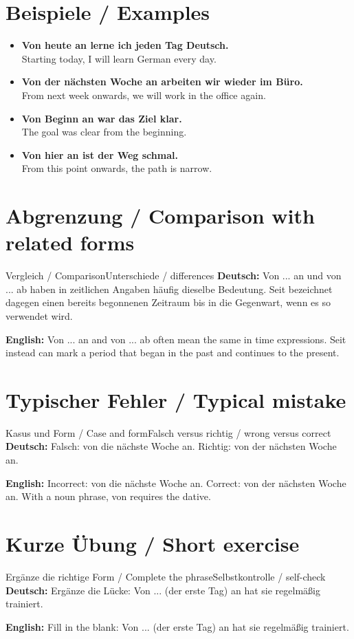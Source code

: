 \documentclass[a4paper,11pt]{article}
\newcommand{\GermanText}[1]{\textbf{Deutsch: }#1\par}
\newcommand{\EnglishText}[1]{{\small\color{SoftGray}\textbf{English: }#1\par}}
\newcommand{\ExampleItem}[2]{\item \textbf{#1}\\{\small\color{SoftGray}#2}}
\begin{document}
\section{Beispiele / Examples}
\begin{exbox}
\begin{itemize}
\ExampleItem{Von heute an lerne ich jeden Tag Deutsch.}{Starting today, I will learn German every day.}
\ExampleItem{Von der nächsten Woche an arbeiten wir wieder im Büro.}{From next week onwards, we will work in the office again.}
\ExampleItem{Von Beginn an war das Ziel klar.}{The goal was clear from the beginning.}
\ExampleItem{Von hier an ist der Weg schmal.}{From this point onwards, the path is narrow.}
\end{itemize}
\end{exbox}
\section{Abgrenzung / Comparison with related forms}
\begin{grammarentry}{Vergleich / Comparison}{Unterschiede / differences}
\GermanText{Von ... an und von ... ab haben in zeitlichen Angaben häufig dieselbe Bedeutung. Seit bezeichnet dagegen einen bereits begonnenen Zeitraum bis in die Gegenwart, wenn es so verwendet wird.}
\EnglishText{Von ... an and von ... ab often mean the same in time expressions. Seit instead can mark a period that began in the past and continues to the present.}
\end{grammarentry}
\section{Typischer Fehler / Typical mistake}
\begin{grammarentry}{Kasus und Form / Case and form}{Falsch versus richtig / wrong versus correct}
\GermanText{Falsch: von die nächste Woche an. Richtig: von der nächsten Woche an.}
\EnglishText{Incorrect: von die nächste Woche an. Correct: von der nächsten Woche an. With a noun phrase, von requires the dative.}
\end{grammarentry}
\section{Kurze Übung / Short exercise}
\begin{grammarentry}{Ergänze die richtige Form / Complete the phrase}{Selbstkontrolle / self-check}
\GermanText{Ergänze die Lücke: Von ... (der erste Tag) an hat sie regelmäßig trainiert.}
\EnglishText{Fill in the blank: Von ... (der erste Tag) an hat sie regelmäßig trainiert.}
\end{grammarentry}
\end{document}
